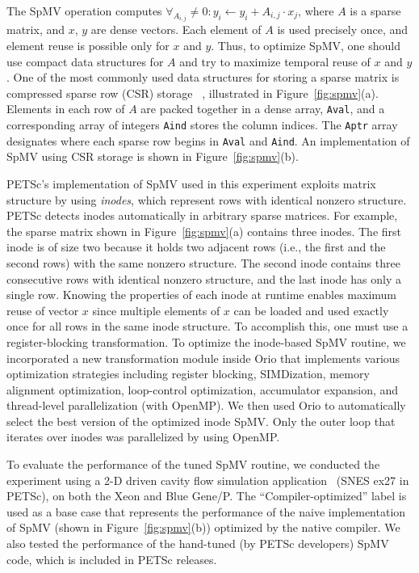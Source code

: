 The SpMV operation computes $\forall_{A_{i,j}} \neq 0:y_{i}
\leftarrow y_{i} + A_{i,j} \cdot x_{j}$, where $A$ is a sparse matrix,
and $x$, $y$ are dense vectors. Each element of $A$ is used precisely once,
and element reuse is possible only for $x$ and $y$. Thus, to optimize SpMV,
one should use compact data structures for $A$ and try to maximize temporal
reuse of $x$ and $y$. One of the most commonly used data structures for
storing a sparse matrix is compressed sparse row (CSR) storage
~\cite{vuduc-thesis},
illustrated in Figure~\ref{fig:spmv}(a). Elements in each row of $A$ are
packed together in a dense array, \texttt{Aval}, and a corresponding array of
integers \texttt{Aind} stores the column indices. The \texttt{Aptr} array
designates where each sparse row begins in \texttt{Aval} and
\texttt{Aind}. An implementation of SpMV using CSR storage is
shown in Figure~\ref{fig:spmv}(b).

PETSc's implementation of SpMV used in this experiment exploits matrix
structure by using \textit{inodes}, which represent rows with identical
nonzero structure.  PETSc detects inodes automatically in arbitrary sparse
matrices. For example, the sparse matrix shown in Figure~\ref{fig:spmv}(a)
contains three inodes. The first inode is of size two because it holds two
adjacent rows (i.e., the first and the second rows) with the same nonzero
structure. The second inode contains three consecutive rows with identical
nonzero structure, and the last inode has only a single row. Knowing the
properties of each inode at runtime enables maximum reuse of vector $x$ since
multiple elements of $x$ can be loaded and used exactly once for all rows in
the same inode structure. To accomplish this, one must use a
register-blocking transformation. To optimize the inode-based SpMV routine,
we incorporated a new transformation module inside Orio that implements
various optimization strategies including register blocking, SIMDization,
memory alignment optimization, loop-control optimization, accumulator
expansion, and thread-level parallelization (with OpenMP). We then used Orio
to automatically select the best version of the optimized inode SpMV. Only
the outer loop that iterates over inodes was parallelized by using OpenMP.

To evaluate the performance of the tuned SpMV routine, we conducted the
experiment using a 2-D driven cavity flow simulation
application~\cite{coff:kell:keye} (SNES ex27 in PETSc), on both the Xeon and
Blue Gene/P. The ``Compiler-optimized'' label is used as a base case that
represents the performance of the naive implementation of SpMV (shown in
Figure~\ref{fig:spmv}(b)) optimized by the native compiler. We also tested
the performance of the hand-tuned (by PETSc developers) SpMV code, which is
included in PETSc releases.

